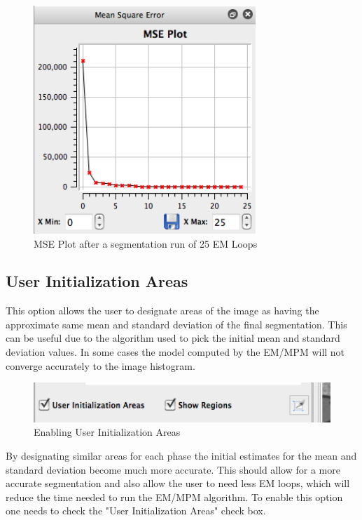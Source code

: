 \documentclass[12pt,oneside]{book}
\begin{document}
\begin{figure}[htbp]
\begin{center}
\includegraphics[width=3.3in]{images/Untitled13.png}
\caption{MSE Plot after a segmentation run of 25 EM Loops}
\label{Untitled13}
\end{center}
\end{figure}

\subsection{User Initialization Areas}
This option allows the user to designate areas of the image as having the approximate same mean and standard deviation of the final segmentation. This can be useful due to the algorithm used to pick the initial mean and standard deviation values. In some cases the model computed by the EM/MPM will not converge accurately to the image histogram.
 
\begin{figure}[htbp]
\begin{center}
\includegraphics[width=5.0in]{images/Untitled8.png}
\caption{Enabling User Initialization Areas}
\label{image8}
\end{center}
\end{figure}

By designating similar areas for each phase the initial estimates for the mean and standard deviation become much more accurate. This should allow for a more accurate segmentation and also allow the user to need less EM loops, which will reduce the time needed to run the EM/MPM algorithm. To enable this option one needs to check the "User Initialization Areas" check box.
 
\end{document}
